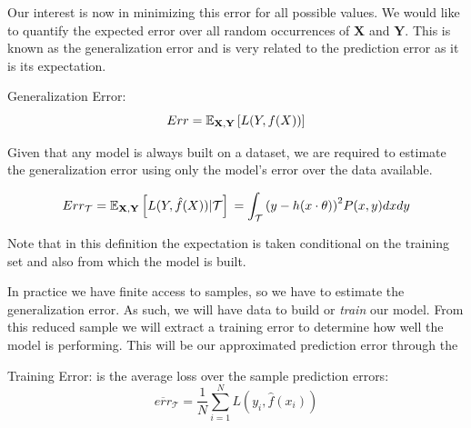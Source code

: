 Our interest is now in minimizing this error for all possible values.
We would like to quantify the expected error over all random occurrences of $\textbf{X}$ and $\textbf{Y}$.
This is known as the generalization error and is very related to the prediction error as it is its expectation.

\begin{definition}{Generalization Error:}
\begin{equation}
Err = \operatorname{\mathbb{E}}_{ \textbf{X}, \textbf{Y} } \left[ L(Y,f(X)) \right]
\end{equation}
\end{definition}

Given that any model is always built on a dataset, we are required to estimate the generalization error using only the model's error over the data available.


\begin{equation}
	Err_{\mathcal{T}} = \operatorname{\mathbb{E}}_{\textbf{X},\textbf{Y}} \left[ L(Y,\hat{f}(X)) | \mathcal{T}\right] \\
	= \int_{\mathcal{T}} {(y - h(x \cdot \theta) )}^2 P(x,y)dxdy
\end{equation}


Note that in this definition the expectation is taken conditional on the training set and also from which the model is built.


In practice we have finite access to samples, so we have to estimate the generalization error.
As such, we will have data to build or \textit{train} our model.
From this reduced sample we will extract a training error to determine how well the model is performing.
This will be our approximated prediction error through the
\begin{definition}{Training Error:}
	is the average loss over the sample prediction errors:
	$$ \overline{err}_{\mathcal{T}} = \frac{1}{N} \sum_{i=1}^N L(y_i, \hat{f}(x_i) )$$
\end{definition}\label{def:trainingError}


